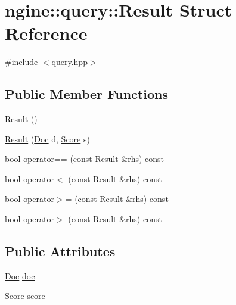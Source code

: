 \hypertarget{structngine_1_1query_1_1Result}{}\section{ngine\+:\+:query\+:\+:Result Struct Reference}
\label{structngine_1_1query_1_1Result}


{\ttfamily \#include $<$query.\+hpp$>$}

\subsection*{Public Member Functions}
\begin{DoxyCompactItemize}
\item 
\hyperlink{structngine_1_1query_1_1Result_a4c8dd32e3e13ffc27de46483c077d99c}{Result} ()
\item 
\hyperlink{structngine_1_1query_1_1Result_aca94fc1de597366c47d3ab5930c029f3}{Result} (\hyperlink{structngine_1_1Doc}{Doc} d, \hyperlink{structngine_1_1Score}{Score} s)
\item 
bool \hyperlink{structngine_1_1query_1_1Result_a34eb1df1154ab0ab492ee95e77edf234}{operator==} (const \hyperlink{structngine_1_1query_1_1Result}{Result} \&rhs) const
\item 
bool \hyperlink{structngine_1_1query_1_1Result_a6df5141cfffe710ff3e5b43358d94ddf}{operator$<$} (const \hyperlink{structngine_1_1query_1_1Result}{Result} \&rhs) const
\item 
bool \hyperlink{structngine_1_1query_1_1Result_ae563d95194ce9ff905a8f4cede93c812}{operator$>$=} (const \hyperlink{structngine_1_1query_1_1Result}{Result} \&rhs) const
\item 
bool \hyperlink{structngine_1_1query_1_1Result_a52c1869064bfd7f51476c4d8560f05f2}{operator$>$} (const \hyperlink{structngine_1_1query_1_1Result}{Result} \&rhs) const
\end{DoxyCompactItemize}
\subsection*{Public Attributes}
\begin{DoxyCompactItemize}
\item 
\hyperlink{structngine_1_1Doc}{Doc} \hyperlink{structngine_1_1query_1_1Result_a5e60300ed3018f83db817b5f8c5c014c}{doc}
\item 
\hyperlink{structngine_1_1Score}{Score} \hyperlink{structngine_1_1query_1_1Result_acc2d6248efc5b0b80104b61cbeb9ca7a}{score}
\end{DoxyCompactItemize}


